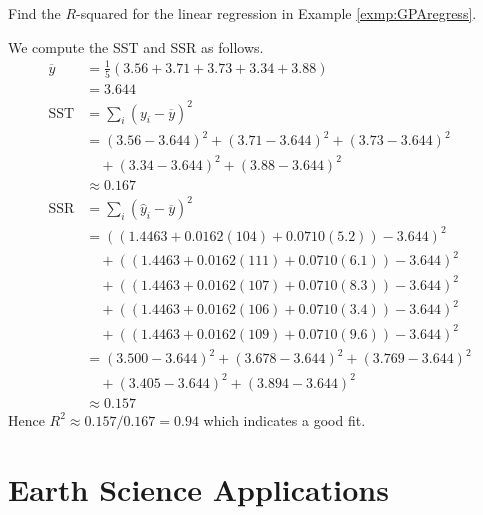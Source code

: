 \begin{exmp}
\label{exmp:GPAregress2}
Find the $R$-squared for the linear regression in Example \ref{exmp:GPAregress}.
\end{exmp}
\begin{solution}
We compute the SST and SSR as follows.
\begin{align*}
\overline{y} &= \frac{1}{5}(3.56 + 3.71 + 3.73 + 3.34 + 3.88) \\
&= 3.644 \\
\text{SST} &= \sum_i (y_i - \overline{y})^2 \\
&= (3.56 - 3.644)^2 + (3.71 - 3.644)^2 + (3.73 - 3.644)^2 \\
&\quad + (3.34 - 3.644)^2 + (3.88 - 3.644)^2 \\
&\approx 0.167 \\
\text{SSR} &= \sum_i (\hat{y}_i - \overline{y})^2 \\
&= ((1.4463 + 0.0162(104)+ 0.0710(5.2)) - 3.644)^2 \\
&\quad + ((1.4463 + 0.0162(111)+ 0.0710(6.1)) - 3.644)^2 \\
&\quad + ((1.4463 + 0.0162(107)+ 0.0710(8.3)) - 3.644)^2 \\
&\quad + ((1.4463 + 0.0162(106)+ 0.0710(3.4)) - 3.644)^2 \\
&\quad + ((1.4463 + 0.0162(109)+ 0.0710(9.6)) - 3.644)^2 \\
&= (3.500 - 3.644)^2 + (3.678 - 3.644)^2 + (3.769 - 3.644)^2 \\
&\quad + (3.405 - 3.644)^2 + (3.894 - 3.644)^2 \\
&\approx 0.157
\end{align*}
Hence $R^2 \approx 0.157/0.167 = 0.94$ which indicates a good fit.
\end{solution}

\section{Earth Science Applications}

